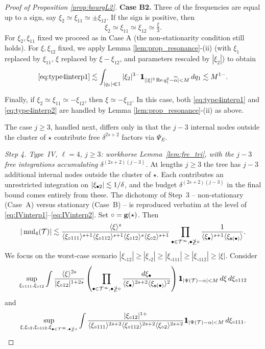 \begin{proof}[Proof of Proposition \ref{prop:bourgL2}]
\smallskip
\noi
\textbf{Case B2.} Three of the frequencies are equal up to a sign, say $\xi_2\simeq  \xi_{11} \simeq \pm \xi_{12}$. If the sign is positive, then
$$
\xi_2\simeq \xi_{11}\simeq \xi_{12} \simeq \tfrac{\xi}{3}.
$$
For $\xi_2, \xi_{11}$ fixed we proceed as in Case A (the non-stationarity condition still holds). For $\xi, \xi_{12}$ fixed, we apply Lemma \ref{lem:prop_resonance}-(ii) (with $\xi_1$ replaced by $\xi_{11}$, $\xi$ replaced by $\xi-\xi_{12}$, and parameters rescaled by $|\xi_2|$) to obtain
\begin{align}
\eqref{eq:type4interp1}\lesssim \int_{|q_1|\ll 1} |\xi_2|^{3-}\ind_{||\xi|^3\Re q_1^2 - \widetilde\alpha|<M} \,dq_1 \lesssim M^{1-}.
\end{align}

Finally, if $\xi_2\simeq \xi_{11}\simeq-\xi_{12}$, then $\xi\simeq -\xi_{12}$. In this case, both \eqref{eq:type4interp1} and \eqref{eq:type4interp2} are handled by Lemma \ref{lem:prop_resonance}-(ii) as above.

The case $j\ge 3$, handled next, differs only in that the $j-3$ internal nodes outside the cluster of $\star$ contribute free $\delta^{2s+2}$ factors via $\Psi_E$.

\medskip

\noi \textit{Step 4. Type~IV, $\ell=4$, $j\ge 3$: workhorse Lemma~\ref{lem:fre_tri}, with the $j-3$ free integrations accumulating $\delta^{(2s+2)(j-3)}$.}
At lengths $j\ge 3$ the tree has $j-3$ additional internal nodes outside the cluster of $\star$. Each contributes an unrestricted integration on $|\xi_{\bullet 2}|\lesssim 1/\delta$, and the budget $\delta^{(2s+2)(j-3)}$ in the final bound comes entirely from these. The dichotomy of Step~3 -- non-stationary (Case~A) versus stationary (Case~B) -- is reproduced verbatim at the level of \eqref{eq:IVinterp1}--\eqref{eq:IVinterp2}.
Set $\circ=\mathbf{g}(\star)$. Then
\begin{equation}\label{eq:typeIVmult}
|\operatorname{mul}_4(\mathcal{T})|\lesssim \frac{\langle \xi \rangle^{s}}{\langle \xi_{\circ111} \rangle^{s+1}\langle \xi_{\circ112} \rangle^{s+1}\langle \xi_{\circ12} \rangle^{s}\langle \xi_{\circ2} \rangle^{s+1}} \prod_{\bullet\in\mathcal{T}^\infty, \bullet\ngeq\circ} \frac{1}{\langle \xi_\bullet \rangle^{s+1}\langle \xi_{\mathbf{s}(\bullet)} \rangle}.
\end{equation}
We focus on the worst-case scenario $|\xi_{\circ12}|\ge |\xi_{\circ 2}|\ge |\xi_{\circ 111}| \ge |\xi_{\circ 112}| \ge |\xi|$. Consider
\begin{equation}\label{eq:IVinterp1}
\sup_{\xi_{\circ111}, \xi_{\circ12}}\int \frac{\jap{\xi}^{2s}}{|\xi_{\circ12}|^{1+2s}}\left(\prod_{\bul\in\TT^\infty, \bul\ngeq\circ} \frac{d\xi_\bul}{\jap{\xi_\bul}^{2s+2}\jap{\xi_{\sbf(\bul)}}^2}\right) \ind_{|\Psi(\TT)-\alpha|<M}\,d\xi\, d\xi_{\circ112}
\end{equation}
and
\begin{equation}\label{eq:IVinterp2}
\sup_{\xi, \xi_{\circ2}, \xi_{\circ112}, \xi_{\bul\in\TT^\infty, \bul\ngeq\circ}}\int \frac{|\xi_{\circ12}|^{1+}}{\jap{\xi_{\circ111}}^{2s+2}\jap{\xi_{\circ112}}^{2s+2}\jap{\xi_{\circ2}}^{2s+2}}\ind_{|\Psi(\TT)-\alpha|<M} \,d\xi_{\circ111}.
\end{equation}


\end{proof}
